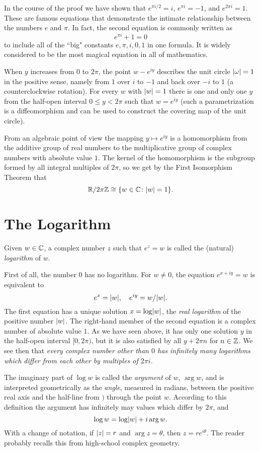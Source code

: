  In the course of the proof we have shown that $e^{\pi i/2}=i$, $e^{\pi i}=-1$, and $e^{2\pi i}=1$. These are famous equations that demonstrate the intimate relationship between the numbers $e$ and $\pi$. In fact, the second equation is commonly written as $$\boxed{e^{\pi i}+1=0}$$ to include all of the ``big" constants $e,\pi,i,0,1$ in one formula. It is widely considered to be the most magical equation in all of mathematics.
 
 When $y$ increases from $0$ to $2\pi$, the point $w-e^{iy}$ describes the unit circle $\lvert \omega \rvert=1$ in the positive sense, namely from $1$ over $i$ to $-1$ and back over $-i$ to $1$ (a counterclockwise rotation). For every $w$ with $\lvert w \rvert=1$ there is one and only one $y$ from the half-open interval $0 \le y<2\pi$ such that $w=e^{iy}$ (such a parametrization is a diffeomorphism and can be used to construct the covering map of the unit circle).
 
 From an algebraic point of view the mapping $y \mapsto e^{iy}$ is a homomorphism from the additive group of real numbers to the multiplicative group of complex numbers with absolute value $1$. The kernel of the homomorphism is the subgroup formed by all integral multiples of $2\pi$, so we get by the First Isomorphism Theorem that $$\mathbb R \slash 2\pi \mathbb Z \cong \{w \in \mathbb C \colon \lvert w \rvert=1\}.$$
 
 \section{The Logarithm}
\begin{definition}
	Given $w \in \mathbb C$, a complex number $z$ such that $e^z=w$ is called the (natural) \emph{logarithm} of $w$.
\end{definition}
First of all, the number $0$ has no logarithm. For $w \neq 0$, the equation $e^{x+iy}=w$ is equivalent to $$e^x=\lvert w \rvert, \quad e^{iy}=w/\lvert w \rvert.$$ The first equation has a unique solution $x=\log \lvert w \rvert$, the \emph{real logarithm} of the positive number $\lvert w \rvert$. The right-hand member of the second equation is a complex number of absolute value $1$. As we have seen above, it has only one solution $y$ in the half-open interval $[0,2\pi)$, but it is also satisfied by all $y+2\pi n$ for $n \in \mathbb Z$. We see then that \textit{every complex number other than $0$ has infinitely many logarithms which differ from each other by multiples of $2\pi i$}.

The imaginary part of $\log w$ is called the \emph{argument} of $w$, $\arg w$, and is interpreted geometrically as the \emph{angle}, measured in radians, between the positive real axis and the half-line from $)$ through the point $w$. According to this definition the argument has infinitely may values which differ by $2\pi$, and $$\log w=\log \lvert w \rvert+i \arg w.$$ With a change of notation, if $\lvert z \rvert=r$ and $\arg z=\theta$, then $z=re^{i \theta}$. The reader probably recalls this from high-school complex geometry.

